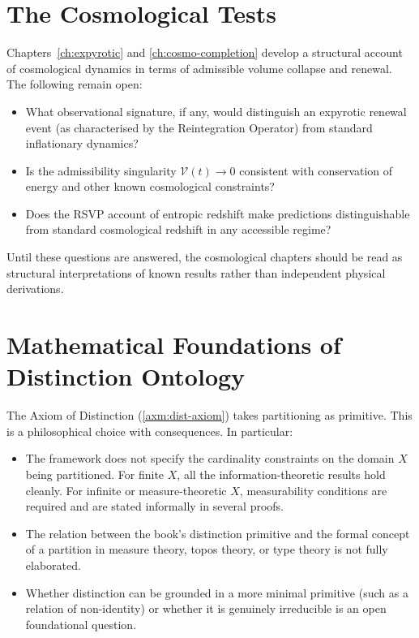 \documentclass[12pt,twoside,openright]{book}
\begin{document}
\section{The Cosmological Tests}

Chapters~\ref{ch:expyrotic} and \ref{ch:cosmo-completion}
develop a structural account of cosmological dynamics in
terms of admissible volume collapse and renewal. The
following remain open:
\begin{itemize}[nosep]
  \item What observational signature, if any, would
        distinguish an expyrotic renewal event (as
        characterised by the Reintegration Operator) from
        standard inflationary dynamics?
  \item Is the admissibility singularity
        $\mathcal{V}(t) \to 0$ consistent with conservation
        of energy and other known cosmological constraints?
  \item Does the RSVP account of entropic redshift make
        predictions distinguishable from standard
        cosmological redshift in any accessible regime?
\end{itemize}
Until these questions are answered, the cosmological
chapters should be read as structural interpretations of
known results rather than independent physical derivations.

\section{Mathematical Foundations of Distinction Ontology}

The Axiom of Distinction (\cref{axm:dist-axiom}) takes
partitioning as primitive. This is a philosophical choice
with consequences. In particular:
\begin{itemize}[nosep]
  \item The framework does not specify the cardinality
        constraints on the domain $X$ being partitioned.
        For finite $X$, all the information-theoretic
        results hold cleanly. For infinite or
        measure-theoretic $X$, measurability conditions
        are required and are stated informally in several
        proofs.
  \item The relation between the book's distinction
        primitive and the formal concept of a partition
        in measure theory, topos theory, or type theory
        is not fully elaborated.
  \item Whether distinction can be grounded in a more
        minimal primitive (such as a relation of
        non-identity) or whether it is genuinely
        irreducible is an open foundational question.
\end{itemize}
\end{document}
